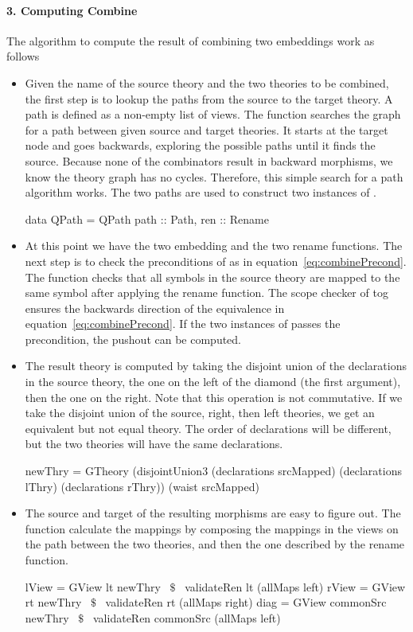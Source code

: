 \paragraph{3. Computing Combine}
The algorithm to compute the result of combining two embeddings work as follows 
\begin{itemize}
    \item Given the name of the source theory and the two theories to be combined, the first step is to lookup the paths from the source to the target theory. A path is defined as a non-empty list of views. The function  searches the graph for a path between given source and target theories. It starts at the target node and goes backwards, exploring the possible paths until it finds the source. Because none of the combinators result in backward morphisms, we know the theory graph has no cycles. Therefore, this simple search for a path algorithm works. The two paths are used to construct two instances of . 
\begin{hscode}
data QPath = QPath { 
  path :: Path,
  ren  :: Rename }
\end{hscode}

    \item At this point we have the two embedding and the two rename functions. The next step is to check the preconditions of  as in equation~\ref{eq:combinePrecond}. The function  checks that all symbols in the source theory are mapped to the same symbol after applying the rename function. The scope checker of tog ensures the backwards direction of the equivalence in equation~\ref{eq:combinePrecond}. If the two instances of  passes the precondition, the pushout can be computed.
    
    \item The result theory is computed by taking the disjoint union of the declarations in the source theory, the one on the left of the diamond (the first argument), then the one on the right. Note that this operation is not commutative. If we take the disjoint union of the source, right, then left theories, we get an equivalent but not equal theory. The order of declarations will be different, but the two theories will have the same declarations. 
\begin{hscode}
 newThry = 
   GTheory (disjointUnion3 (declarations srcMapped)
                           (declarations lThry) 
                           (declarations rThry)) 
           (waist srcMapped)
\end{hscode}    
    \item The source and target of the resulting morphisms are easy to figure out. The function  calculate the mappings by composing the mappings in the views on the path between the two theories, and then the one described by the rename function. 
\begin{hscode}
lView = GView lt newThry ~$\$$~ validateRen lt (allMaps left)
rView = GView rt newThry ~$\$$~ validateRen rt (allMaps right)
diag  = GView commonSrc newThry ~$\$$~ validateRen commonSrc (allMaps left)
\end{hscode}
\end{itemize}


